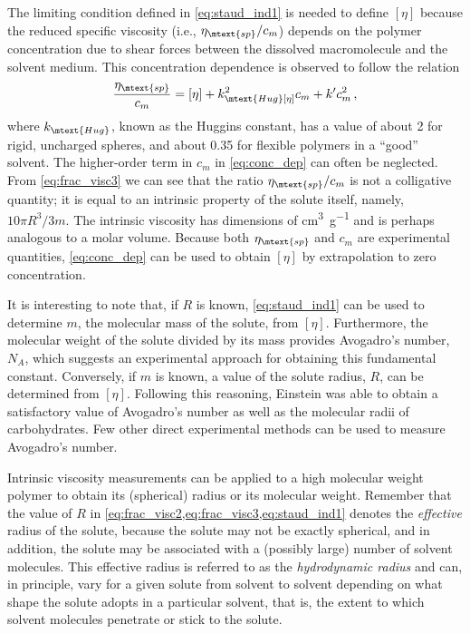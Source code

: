 The limiting condition defined in \cref{eq:staud_ind1} is needed to define \( [\eta] \) because the reduced specific viscosity (i.e., \( \eta_\mtext{sp}/c_m \)) depends on the polymer concentration due to shear forces between the dissolved macromolecule and the solvent medium. 
This concentration dependence is observed to follow the relation
\begin{equation}
	\frac{\eta_\mtext{sp}}{c_m} = [\eta] + k_\mtext{Hug} [\eta]^2 c_m + k' c_m^2 \, ,
	\label{eq:conc_dep}
\end{equation}
where \( k_\mtext{Hug} \), known as the Huggins constant, has a value of about \num{2} for rigid, uncharged spheres, and about \num{0.35} for flexible polymers in a ``good'' solvent.\autocite{tanford61} 
The higher-order term in \( c_m \) in \cref{eq:conc_dep} can often be neglected. 
From \cref{eq:frac_visc3} we can see that the ratio \( \eta_\mtext{sp}/c_m \) is not a colligative quantity; it is equal to an intrinsic property of the solute itself, namely, \( 10 \pi R^3 / 3 m \). 
The intrinsic viscosity has dimensions of \unit{\cm\cubed \per\g} and is perhaps analogous to a molar volume. 
Because both \( \eta_\mtext{sp} \) and \( c_m \) are experimental quantities, \cref{eq:conc_dep} can be used to obtain \( [\eta] \) by extrapolation to zero concentration.

It is interesting to note that, if \( R \) is known, \cref{eq:staud_ind1} can be used to determine \( m \), the molecular mass of the solute, from \( [\eta] \). 
Furthermore, the molecular weight of the solute divided by its mass provides Avogadro's number, \( N_A \), which suggests an experimental approach for obtaining this fundamental constant. 
Conversely, if \( m \) is known, a value of the solute radius, \( R \), can be determined from \( [\eta] \). 
Following this reasoning, Einstein was able to obtain a satisfactory value of Avogadro's number as well as the molecular radii of carbohydrates. 
Few other direct experimental methods can be used to measure Avogadro's number.

Intrinsic viscosity measurements can be applied to a high molecular weight polymer to obtain its (spherical) radius or its molecular weight. 
Remember that the value of \( R \) in \cref{eq:frac_visc2,eq:frac_visc3,eq:staud_ind1} denotes the \emph{effective} radius of the solute, because the solute may not be exactly spherical, and in addition, the solute may be associated with a (possibly large) number of solvent molecules. 
This effective radius is referred to as the \emph{hydrodynamic radius} and can, in principle, vary for a given solute from solvent to solvent depending on what shape the solute adopts in a particular solvent, that is, the extent to which solvent molecules penetrate or stick to the solute.

